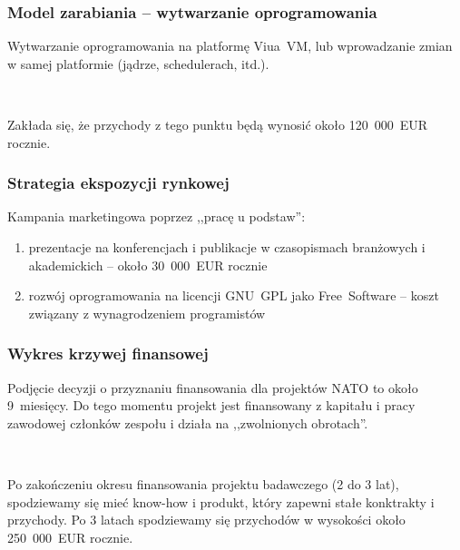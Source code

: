 \documentclass[aspectratio=169]{beamer}
\begin{document}
\begin{frame}
    \frametitle{Model zarabiania -- wytwarzanie oprogramowania}

    Wytwarzanie oprogramowania na platformę Viua~VM, lub
    \newline
    wprowadzanie zmian w samej platformie (jądrze, schedulerach, itd.).

    ~

    Zakłada się, że przychody z tego punktu będą wynosić około 120~000~EUR
    rocznie.
\end{frame}

\begin{frame}
    \frametitle{Strategia ekspozycji rynkowej}

    Kampania marketingowa poprzez ,,pracę u podstaw'':

    \begin{enumerate}
        \item prezentacje na konferencjach i publikacje w czasopismach
            branżowych i akademickich -- około 30~000~EUR rocznie
        \item rozwój oprogramowania na licencji GNU~GPL jako Free~Software --
            koszt związany z wynagrodzeniem programistów
    \end{enumerate}
\end{frame}

\begin{frame}
    \frametitle{Wykres krzywej finansowej}

    Podjęcie decyzji o przyznaniu finansowania dla projektów NATO to około
    9~miesięcy. Do tego momentu projekt jest finansowany z kapitału i pracy
    zawodowej członków zespołu i działa na ,,zwolnionych obrotach''.

    ~

    Po zakończeniu okresu finansowania projektu badawczego (2 do 3 lat),
    spodziewamy się mieć know-how i produkt, który zapewni stałe konktrakty i przychody.
    Po 3 latach spodziewamy się przychodów w wysokości około 250~000~EUR rocznie.
\end{frame}
\end{document}
